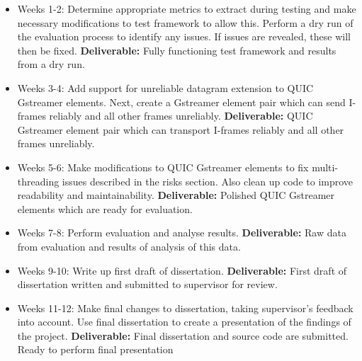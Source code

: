 \documentclass[11pt]{article}
\begin{document}
\begin{itemize}
    \item
      Weeks 1-2: 
      Determine appropriate metrics to extract during testing and make necessary modifications to test framework to allow this.  
      Perform a dry run of the evaluation process to identify any issues. If issues are revealed, these will then be fixed. \textbf{Deliverable:}
      Fully functioning test framework and results from a dry run.
    \item
      Weeks 3-4: 
      Add support for unreliable datagram extension to QUIC Gstreamer elements. Next, create a Gstreamer element pair which can send I-frames reliably and all other frames unreliably. \textbf{Deliverable:} QUIC Gstreamer element pair
      which can transport I-frames reliably and all other frames unreliably.
    \item
      Weeks 5-6: Make modifications to QUIC Gstreamer elements to fix multi-threading issues described in the risks section. Also clean up code to improve readability and maintainability.
      \textbf{Deliverable:} Polished QUIC Gstreamer elements which are ready for evaluation.
    \item
      Weeks 7-8: Perform evaluation and analyse results.
      \textbf{Deliverable:} Raw data from evaluation and results of analysis of this data.
    \item
      Weeks 9-10: Write up first draft of dissertation. \textbf{Deliverable:}  First draft of dissertation written and submitted to supervisor for review.
    \item
      Weeks 11-12: Make final changes to dissertation, taking supervisor's feedback into account. Use final dissertation to create a presentation of the findings of the project.
      \textbf{Deliverable:} Final dissertation and source code are submitted. Ready to perform final presentation
\end{itemize}
    
\end{document}
